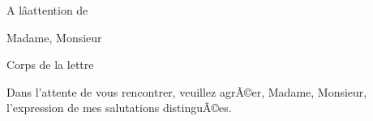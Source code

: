 \documentclass[10pt]{lettre}
\begin{document}
\begin{letter}{A lâattention de} %

\signature{PrÃ©nom \textsc{Nom}}
\address{PrÃ©nom \textsc{Nom}\\Adresse}
\nofax %


\opening{Madame, Monsieur} %

 Corps de la lettre
  
  
\closing{Dans l'attente de vous rencontrer, veuillez agrÃ©er, Madame, Monsieur, l'expression de mes salutations distinguÃ©es.} %

\end{letter}
\end{document}
